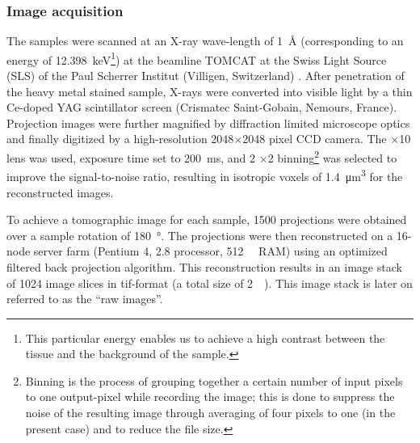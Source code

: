 \subsubsection{Image acquisition}
The samples were scanned at an X-ray wave-length of \SI{1}{\angstrom} (corresponding to an energy of \SI{12.398}{\kilo\electronvolt}\footnote{This particular energy enables us to achieve a high contrast between the tissue and the background of the sample.}) at the beamline TOMCAT at the Swiss Light Source (SLS) of the Paul Scherrer Institut (Villigen, Switzerland) \cite{Stampanoni2002,Stampanoni2007}. After penetration of the heavy metal stained sample, X-rays were converted into visible light by a thin Ce-doped YAG scintillator screen (Crismatec Saint-Gobain, Nemours, France). Projection images were further magnified by diffraction limited microscope optics and finally digitized by a high-resolution 2048$\times$2048 pixel CCD camera. The $\times$10 lens was used, exposure time set to \SI{200}{\milli\second}, and 2 $\times$2 binning\footnote{Binning is the process of grouping together a certain number of input pixels to one output-pixel while recording the image; this is done to suppress the noise of the resulting image through averaging of four pixels to one (in the present case) and to reduce the file size.} was selected to improve the signal-to-noise ratio, resulting in isotropic voxels of \SI{1.4}{\micro\meter\cubed} for the reconstructed images.

To achieve a tomographic image for each sample, 1500 projections were obtained over a sample rotation of \SI{180}{\degree}. The projections were then reconstructed on a 16-node server farm (Pentium 4, \SI{2.8}{\gigahertz} processor, \SI{512}{\mega\byte} RAM) using an optimized filtered back projection algorithm. This reconstruction results in an image stack of 1024 image slices in tif-format (a total size of \SI{2}{\giga\byte}). This image stack is later on referred to as the ``raw images''.


